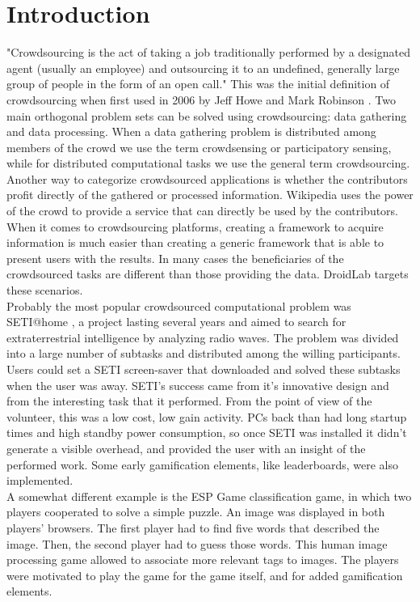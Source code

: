 \documentclass[conference,letterpaper]{IEEEtran}
\begin{document}
\section{Introduction}
\label{sec:intro}
"Crowdsourcing is the act of taking a job traditionally performed by a designated agent (usually an employee) and outsourcing it to an undefined, generally large group of people in the form of an open call." This was the initial definition of crowdsourcing when first used in 2006 by Jeff Howe and Mark Robinson \cite{crowdsourcing_definition}. Two main orthogonal problem sets can be solved using crowdsourcing: data gathering and data processing. When a data gathering problem is distributed among members of the crowd we use the term crowdsensing or participatory sensing, while for distributed computational tasks we use the general term crowdsourcing.\\
\indent Another way to categorize crowdsourced applications is whether the contributors profit directly of the gathered or processed information. Wikipedia uses the power of the crowd to provide a service that can directly be used by the contributors. When it comes to crowdsourcing platforms, creating a framework to acquire information is much easier than creating a generic framework that is able to present users with the results. In many cases the beneficiaries of the crowdsourced tasks are different than those providing the data. DroidLab targets these scenarios.\\
\indent Probably the most popular crowdsourced computational problem was SETI@home \cite{Korpela}, a project lasting several years and aimed to search for extraterrestrial intelligence by analyzing radio waves. The problem was divided into a large number of subtasks and distributed among the willing participants. Users could set a SETI screen-saver that downloaded and solved these subtasks when the user was away. SETI's success came from it's innovative design and from the interesting task that it performed. From the point of view of the volunteer, this was a low cost, low gain activity. PCs back than had long startup times and high standby power consumption, so once SETI was installed it didn't generate a visible overhead, and provided the user with an insight of the performed work. Some early gamification elements, like leaderboards, were also implemented.\\
\indent A somewhat different example is the ESP Game \cite{VonAhn2006} classification game, in which two players cooperated to solve a simple puzzle. An image was displayed in both players' browsers. The first player had to find five words that described the image. Then, the second player had to guess those words. This human image processing game allowed to associate more relevant tags to images. The players were motivated to play the game for the game itself, and for added gamification elements.\\
\end{document}
